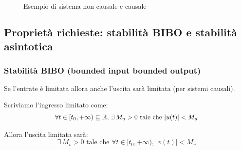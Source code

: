 		
			\begin{figure}[H]
				\centering
				 \quad
				\caption{ Esempio di sistema non causale e causale  }
				\label{fig: sistcausncaus}
			\end{figure}
			
	
	\subsection{Proprietà richieste: stabilità BIBO e stabilità asintotica}

		\subsubsection{Stabilità BIBO (bounded input bounded output)}\label{sist_prop_BIBOstab}
			
			Se l'entrate è limitata allora anche l'uscita sarà limitata (per sistemi causali).
			
			Scriviamo l'ingresso limitato come:
			\[
				\forall t \in [t_0, + \infty) \subseteq \mathbb{R}\text{, } \exists \, M_u >0 \text{ tale che } \lvert u(t) \rvert < M_u	
			\]
			
			Allora l'uscita limitata sarà:
				\[
			\exists \, M_v > 0 \text{ tale che } \forall t \in [t_0, + \infty) \text{, } \lvert v(t) \rvert < M_v
			\]
			
